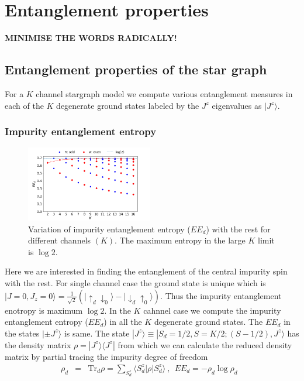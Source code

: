 \documentclass[reprint,prb,superscriptaddress]{revtex4-1}
\begin{document}
\section{Entanglement properties}
\label{sec:ent_prop}
\textbf{MINIMISE THE WORDS RADICALLY!}
\subsection{Entanglement properties of the star graph}
\label{sec:EE_Stargraph}

\noindent For a $K$ channel stargraph model we compute various entanglement measures in each of the $K$ degenerate ground states labeled by the $J^z$ eigenvalues as $|J^z\rangle$.
\subsubsection{Impurity entanglement entropy}
\begin{figure}[!htpb]
\centering
\includegraphics[width=0.49\textwidth]{plt/EE_multi_channel_ANN.png}
\caption{Variation of impurity entanglement entropy ($EE_d$) with the rest for different channels $(K)$. The maximum entropy in the large $K$ limit is $\log 2$.}
\label{fig:EE_d}
\end{figure}
\noindent Here we are interested in finding the entanglement of the central impurity spin with the rest. For single channel case the ground state is unique which is $|J=0,J_z=0 \rangle = \frac{1}{\sqrt{2}} (|\uparrow_{d}\downarrow_0\rangle -|\downarrow_d \uparrow_0\rangle)$. Thus the impurity entanglement enotropy is maximum $\log 2$. In the $K$ cahnnel case we compute the impurity entanglement entropy ($EE_d$) in all the $K$ degenerate ground states. The $EE_d$ in the states $|\pm J^z\rangle$ is same. The state $|J^z\rangle \equiv |S_d=1/2,S=K/2;(S-1/2),J^z\rangle$ has the density matrix $\rho=|J^z\rangle\langle J^z|$ from which we can calculate the reduced density matrix by partial tracing the impurity degree of freedom 
\begin{eqnarray}
\rho_{d}&=& \textrm{Tr}_{d} \rho=\sum_{S_d^z} \langle S_d^z| \rho | S^z_d\rangle ~,~~EE_d = -\rho_{d} \log \rho_{d}~~~
\end{eqnarray}
\end{document}
